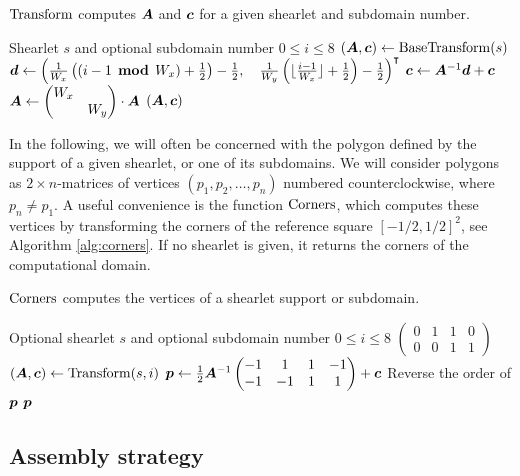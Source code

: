 \begin{algorithm}
\caption{$\operatorname{Transform}$ computes ${\bm A}$ and ${\bm c}$ for a given shearlet and subdomain number.} \label{alg:trf}
\begin{algorithmic}[1]
\REQUIRE Shearlet $s$ and optional subdomain number $0\leq i\leq 8$
\STATE $({\bm A},{\bm c})\leftarrow \operatorname{BaseTransform}(s)$
\STATE ${\bm d}\leftarrow \left(\frac{1}{W_x}\left(\left(i-1\;\operatorname{\textbf{mod}}\; W_x\right)+\frac{1}{2}\right)-\frac{1}{2},\quad
        \frac{1}{W_y}\left(\lfloor\frac{i-1}{W_x}\rfloor+\frac{1}{2}\right)-\frac{1}{2}\right)^\intercal$
\STATE ${\bm c}\leftarrow {\bm A}^{-1}{\bm d}+{\bm c}$
\STATE ${\bm A}\leftarrow \begin{pmatrix} W_x&\\&W_y \end{pmatrix} \cdot {\bm A}$
\ENDIF
\RETURN $({\bm A},{\bm c})$
\end{algorithmic}
\end{algorithm}

In the following, we will often be concerned with the polygon defined by the support of a given shearlet, or
one of its subdomains. We will consider polygons as $2\times n$-matrices of vertices $(p_1,p_2,\ldots,p_n)$
numbered counterclockwise, where $p_n\neq p_1$. A useful convenience is the function $\operatorname{Corners}$, which
computes these vertices by transforming the corners of the reference square $[-1/2,1/2]^2$, see Algorithm
\ref{alg:corners}. If no shearlet is given, it returns the corners of the computational domain.

\begin{algorithm}
\caption{$\operatorname{Corners}$ computes the vertices of a shearlet support or subdomain.} \label{alg:corners}
\begin{algorithmic}[1]
\REQUIRE Optional shearlet $s$ and optional subdomain number $0\leq i\leq 8$
\RETURN $\begin{pmatrix} 0&1&1&0 \\ 0&0&1&1 \end{pmatrix}$
\ENDIF
\STATE $({\bm A},{\bm c})\leftarrow \operatorname{Transform}(s,i)$
\STATE ${\bm p}\leftarrow \frac{1}{2} {\bm A}^{-1}\begin{pmatrix} -1&1&1&-1 \\ -1&-1&1&1 \end{pmatrix} + {\bm c}$
\STATE Reverse the order of ${\bm p}$
\ENDIF
\RETURN ${\bm p}$
\end{algorithmic}
\end{algorithm}

\subsection{Assembly strategy} \label{ssec:assemblystrat}

